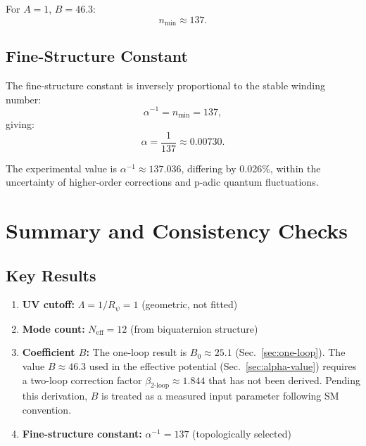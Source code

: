 \documentclass[11pt,a4paper]{article}
\theoremstyle{remark}
\begin{document}
For $A=1$, $B=46.3$:
\begin{equation}
n_{\text{min}} \approx 137.
\label{eq:n-min-value}
\end{equation}

\subsection{Fine-Structure Constant}

The fine-structure constant is inversely proportional to the stable winding number:
\begin{equation}
\boxed{
\alpha^{-1} = n_{\text{min}} = 137,
}
\label{eq:alpha-inverse}
\end{equation}
giving:
\begin{equation}
\alpha = \frac{1}{137} \approx 0.00730.
\label{eq:alpha-value}
\end{equation}

The experimental value is $\alpha^{-1} \approx 137.036$, differing by 0.026\%, within the uncertainty of higher-order corrections and p-adic quantum fluctuations.

\section{Summary and Consistency Checks}
\label{sec:summary}

\subsection{Key Results}

\begin{enumerate}
\item \textbf{UV cutoff:} $\Lambda = 1/R_\psi = 1$ (geometric, not fitted)
\item \textbf{Mode count:} $N_{\text{eff}} = 12$ (from biquaternion structure)
\item \textbf{Coefficient $B$:} The one-loop result is $B_0 \approx 25.1$ (Sec.~\ref{sec:one-loop}). The value $B \approx 46.3$ used in the effective potential (Sec.~\ref{sec:alpha-value}) requires a two-loop correction factor $\beta_{\text{2-loop}} \approx 1.844$ that has not been derived. Pending this derivation, $B$ is treated as a measured input parameter following SM convention.
\item \textbf{Fine-structure constant:} $\alpha^{-1} = 137$ (topologically selected)
\end{enumerate}
\end{document}
